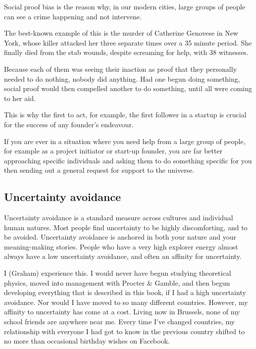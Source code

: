 Social proof bias is the reason why, in our modern cities, large groups of people can see a crime happening and not intervene. 


The best-known example of this is the murder of Catherine Genovese in New York, whose killer attacked her three separate times over a 35 minute period. She finally died from the stab wounds, despite screaming for help, with 38 witnesses. 


Because each of them was seeing their inaction as proof that they personally needed to do nothing, nobody did anything. Had one begun doing something, social proof would then compelled another to do something, until all were coming to her aid. 


This is why the first to act, for example, the first follower in a startup is crucial for the success of any founder's endeavour.


If you are ever in a situation where you need help from a large group of people, for example as a project initiator or start-up founder, you are far better approaching specific individuals and asking them to do something specific for you then sending out a general request for support to the universe.




\subsection{Uncertainty avoidance}
Uncertainty avoidance  is a standard measure across cultures and individual human natures. Most people find uncertainty to be highly discomforting, and to be avoided. Uncertainty avoidance is anchored in both your nature  and your meaning\hyp{}making stories.  
People who have a very high explorer energy almost always have a low uncertainty avoidance, and often an affinity for uncertainty. 


\begin{longstoryblock}
I (Graham) experience this. I would never have begun studying theoretical physics, moved into management with Procter \& Gamble,  and then begun developing everything that is described in this book, if I had a high uncertainty avoidance. Nor would I have moved to so many different countries. However, my affinity to uncertainty has come at a cost. Living now in Brussels, none of my school friends are anywhere near me. Every time I've changed countries, my relationship with everyone I had got to know in the previous country shifted to no more than occasional birthday wishes on Facebook.
\end{longstoryblock}


